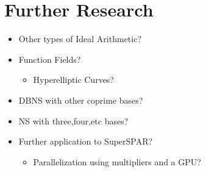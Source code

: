 \documentclass[11pt, letterpaper]{article}
\theoremstyle{definition}
\begin{document}
\bigbreak
\section{Further Research}
\begin{itemize}
\item Other types of Ideal Arithmetic?
\item Function Fields?
	\begin{itemize}
	\item Hyperelliptic Curves?
	\end{itemize}
\item DBNS with other coprime bases?
\item NS with three,four,etc bases?
\item Further application to SuperSPAR?
	\begin{itemize}
	\item Parallelization using multipliers and a GPU?
	\end{itemize}
\end{itemize}
\end{document}
